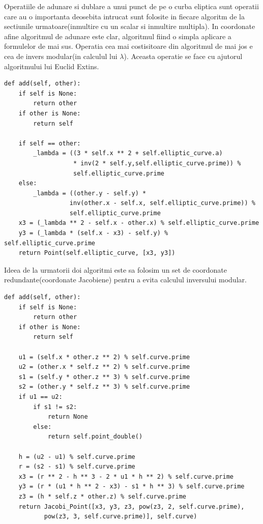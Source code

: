 Operatiile de adunare si dublare a unui punct de pe o curba eliptica sunt operatii care au o importanta deosebita intrucat sunt folosite in fiecare algoritm de la sectiunile urmatoare(inmultire cu un scalar si inmultire multipla).
In coordonate afine algoritmul de adunare este clar, algoritmul fiind o simpla aplicare a formulelor de mai sus. Operatia cea mai costisitoare din algoritmul de mai jos e cea de invers modular(in calculul lui $\lambda$). Aceasta operatie se face cu ajutorul algoritmului lui Euclid Extins.

\begin{lstlisting} 
def add(self, other):
	if self is None:
		return other
	if other is None:
		return self

	if self == other:
		_lambda = ((3 * self.x ** 2 + self.elliptic_curve.a) 
                   * inv(2 * self.y,self.elliptic_curve.prime)) % 
                   self.elliptic_curve.prime
	else:
		_lambda = ((other.y - self.y) * 
                  inv(other.x - self.x, self.elliptic_curve.prime)) %
                  self.elliptic_curve.prime
	x3 = (_lambda ** 2 - self.x - other.x) % self.elliptic_curve.prime
	y3 = (_lambda * (self.x - x3) - self.y) % self.elliptic_curve.prime
	return Point(self.elliptic_curve, [x3, y3])
\end{lstlisting}

Ideea de la urmatorii doi algoritmi  este sa folosim un set de coordonate redundante(coordonate Jacobiene) pentru a evita calculul inversului modular.

\begin{lstlisting}
def add(self, other):
    if self is None:
        return other
    if other is None:
        return self

    u1 = (self.x * other.z ** 2) % self.curve.prime
    u2 = (other.x * self.z ** 2) % self.curve.prime
    s1 = (self.y * other.z ** 3) % self.curve.prime
    s2 = (other.y * self.z ** 3) % self.curve.prime
    if u1 == u2:
        if s1 != s2:
            return None
        else:
            return self.point_double()

    h = (u2 - u1) % self.curve.prime
    r = (s2 - s1) % self.curve.prime
    x3 = (r ** 2 - h ** 3 - 2 * u1 * h ** 2) % self.curve.prime
    y3 = (r * (u1 * h ** 2 - x3) - s1 * h ** 3) % self.curve.prime
    z3 = (h * self.z * other.z) % self.curve.prime
    return Jacobi_Point([x3, y3, z3, pow(z3, 2, self.curve.prime), 
           pow(z3, 3, self.curve.prime)], self.curve)
\end{lstlisting}

